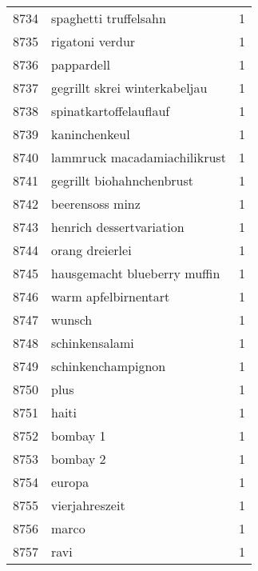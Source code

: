 \begin{tabular}{llr}
8734 &                              spaghetti truffelsahn &      1 \\
8735 &                                    rigatoni verdur &      1 \\
8736 &                                         pappardell &      1 \\
8737 &                      gegrillt skrei winterkabeljau &      1 \\
8738 &                             spinatkartoffelauflauf &      1 \\
8739 &                                      kaninchenkeul &      1 \\
8740 &                       lammruck macadamiachilikrust &      1 \\
8741 &                          gegrillt biohahnchenbrust &      1 \\
8742 &                                    beerensoss minz &      1 \\
8743 &                           henrich dessertvariation &      1 \\
8744 &                                    orang dreierlei &      1 \\
8745 &                       hausgemacht blueberry muffin &      1 \\
8746 &                               warm apfelbirnentart &      1 \\
8747 &                                             wunsch &      1 \\
8748 &                                     schinkensalami &      1 \\
8749 &                                 schinkenchampignon &      1 \\
8750 &                                               plus &      1 \\
8751 &                                              haiti &      1 \\
8752 &                                           bombay 1 &      1 \\
8753 &                                           bombay 2 &      1 \\
8754 &                                             europa &      1 \\
8755 &                                     vierjahreszeit &      1 \\
8756 &                                              marco &      1 \\
8757 &                                               ravi &      1 \\

\end{tabular}
